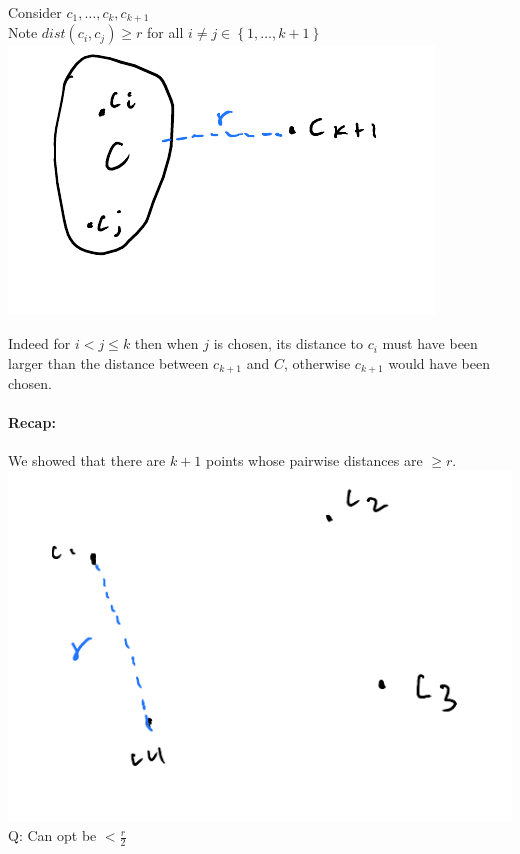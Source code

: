\documentclass[12 pt]{article}
\begin{document}
          Consider $c_1,\ldots, c_k, c_{k+1}$
          \\ Note $dist(c_i, c_j) \geq r$ for all $i \neq j \in
          \left\{1,\ldots,k+1\right\}$
          \\ \includegraphics[width=.9\textwidth]{i156.pdf}

          Indeed for $i < j \leq k$ then when $j$ is chosen, its
          distance to $c_i$ must have been larger than the distance
          between $c_{k+1}$ and $C$, otherwise $c_{k+1}$ would have
          been chosen.
          \paragraph{Recap:} We showed that there are $k+1$ points
          whose pairwise distances are $\geq r$.
          \\ \includegraphics[width=.9\textwidth]{i157.pdf}
          \\ Q: Can opt be $< \frac{r}{2}$
\end{document}
